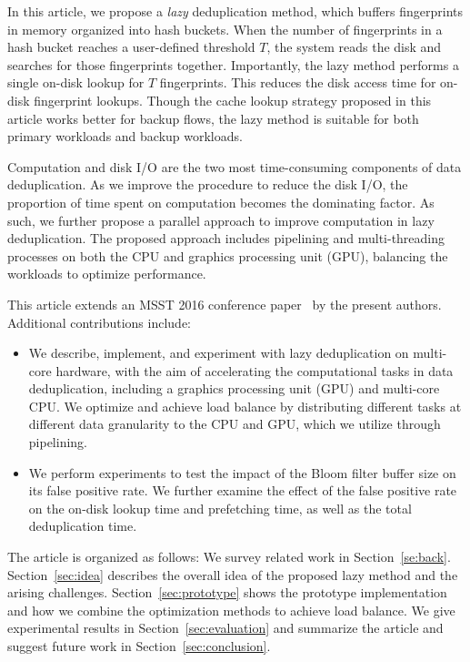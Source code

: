 \documentclass[prodmode,acmtecs]{acmsmall}
\begin{document}
In this article, we propose a \emph{lazy} deduplication method, which buffers fingerprints in memory organized into hash buckets.  When the number of fingerprints in a hash bucket reaches a user-defined threshold $T$, the system reads the disk and searches for those fingerprints together. Importantly, the lazy method performs a single on-disk lookup for $T$ fingerprints. This reduces the disk access time for on-disk fingerprint lookups. Though the cache lookup strategy proposed in this article works better for backup flows, the lazy method is suitable for both primary workloads and backup workloads.

Computation and disk I/O are the two most time-consuming components of data deduplication. As we improve the procedure to reduce the disk I/O, the proportion of time spent on computation becomes the dominating factor.  As such, we further propose a parallel approach to improve computation in lazy deduplication.  The proposed approach includes pipelining and multi-threading processes on both the CPU and graphics processing unit (GPU), balancing the workloads to optimize performance.

This article extends an MSST 2016 conference paper~\cite{ma2016lazy} by the present authors. Additional contributions include:

\begin{itemize}
\item We describe, implement, and experiment with lazy deduplication on multi-core hardware, with the aim of accelerating the computational tasks in data deduplication, including a graphics processing unit (GPU) and multi-core CPU.  We optimize and achieve load balance by distributing different tasks at different data granularity to the CPU and GPU, which we utilize through pipelining.
\item We perform experiments to test the impact of the Bloom filter buffer size on its false positive rate.  We further examine the effect of the false positive rate on the on-disk lookup time and prefetching time, as well as the total deduplication time.

\end{itemize}

The article is organized as follows: We survey related work in Section~\ref{se:back}.  Section~\ref{sec:idea} describes the overall idea of the proposed lazy method and the arising challenges. Section~\ref{sec:prototype} shows the prototype implementation and how we combine the optimization methods to achieve load balance. We give experimental results in Section~\ref{sec:evaluation} and summarize the article and suggest future work in Section~\ref{sec:conclusion}.
\end{document}
